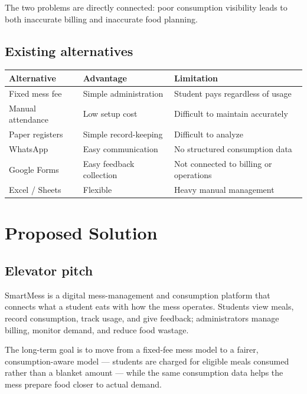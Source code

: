 \documentclass[12pt,a4paper]{article}
\begin{document}
The two problems are directly connected: poor consumption visibility leads to
both inaccurate billing and inaccurate food planning.

\subsection*{Existing alternatives}

\begin{center}
\small
\begin{tabularx}{0.98\textwidth}{L{0.23\textwidth} L{0.28\textwidth} Y}
\toprule
\textbf{Alternative} & \textbf{Advantage} & \textbf{Limitation}\\
\midrule
Fixed mess fee & Simple administration & Student pays regardless of usage\\
Manual attendance & Low setup cost & Difficult to maintain accurately\\
Paper registers & Simple record-keeping & Difficult to analyze\\
WhatsApp & Easy communication & No structured consumption data\\
Google Forms & Easy feedback collection & Not connected to billing or operations\\
Excel / Sheets & Flexible & Heavy manual management\\
\bottomrule
\end{tabularx}
\end{center}


\section{Proposed Solution}

\subsection*{Elevator pitch}

SmartMess is a digital mess-management and consumption platform that connects
what a student eats with how the mess operates. Students view meals, record
consumption, track usage, and give feedback; administrators manage billing,
monitor demand, and reduce food wastage.

The long-term goal is to move from a fixed-fee mess model to a fairer,
consumption-aware model --- students are charged for eligible meals consumed
rather than a blanket amount --- while the same consumption data helps the mess
prepare food closer to actual demand.
\end{document}
